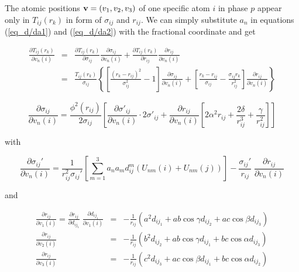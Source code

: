 The atomic positions ${\bf v} = (v_{1},v_{2},v_{3})$ of one specific
atom $i$ in phase $p$ appear only in $T_{ij}(r_{k})$ in form of
$\sigma_{ij}$ and $r_{ij}$. We can simply substitute $a_{n}$ in equations
(\ref{eq_d/da1}) and (\ref{eq_d/da2}) with the fractional coordinate and get

\begin{eqnarray}
  \frac{\partial T_{ij}(r_{k})}{\partial v_{n}(i)} & = &
     \frac{\partial T_{ij}(r_{k})}{\partial \sigma_{ij}}
     \frac{\partial \sigma_{ij}} {\partial v_{n}(i)} +
     \frac{\partial T_{ij}(r_{k})}{\partial r_{ij}}
     \frac{\partial r_{ij}}      {\partial v_{n}(i)} \nonumber \\
  & = & \frac{T_{ij}(r_{k})}{\sigma_{ij}} \left \{ \left [
     \frac{(r_{k} - r_{ij})^{2}}{\sigma_{ij}^{2}} - 1 \right ]
     \frac{\partial \sigma_{ij}} {\partial v_{n}(i)} +
     \left [ \frac{r_{k} - r_{ij}}{\sigma_{ij}}
           - \frac{\sigma_{ij} r_{k}}{r^{2}_{ij}} \right ]
     \frac{\partial r_{ij}}{\partial v_{n}(i)} \right \}
  \label{eq_d/df1}
\end{eqnarray}

\begin{equation}
    \frac{\partial \sigma_{ij}}{\partial v_{n}(i)} =
    \frac{\phi^{2}(r_{ij})}{2 \sigma_{ij}} \left [
    \frac{\partial \sigma'_{ij}}{\partial v_{n}(i)} \cdot 2
    \sigma'_{ij} +
    \frac{\partial r_{ij}}{\partial v_{n}(i)} \left [
    2 \alpha^{2} r_{ij} + \frac{2 \delta}{r^{3}_{ij}} +
    \frac{\gamma}{r^{2}_{ij}} \right ] \right ]
  \label{eq_d/df2}
\end{equation}

\noindent
with

\begin{equation}
  \frac{\partial \sigma_{ij}'} {\partial v_{n}(i)} =
    \frac{1}{r_{ij}^{2}\sigma_{ij}'} \left [ \sum_{m=1}^{3}
    a_{n}a_{m}d_{ij}^{m} ( U_{nm}(i) + U_{nm}(j)) \right ] -
    \frac{\sigma_{ij}'}{r_{ij}} \;
    \frac{\partial r_{ij}} {\partial v_{n}(i)}
  \label{eq_d/df3}
\end{equation}

\noindent
and

\begin{eqnarray}
  \frac{\partial r_{ij}} {\partial v_{1}(i)} =
  \frac{\partial r_{ij}}     {\partial d_{ij_{1}}} \;
  \frac{\partial d_{ij_{1}}} {\partial v_{1}(i)} & = &
   -\frac{1}{r_{ij}}(a^{2}d_{ij_{1}}+ab\cos\gamma d_{ij_{2}}+
                                     ac\cos\beta  d_{ij_{3}})\\
  \frac{\partial r_{ij}} {\partial v_{2}(i)} & = &
   -\frac{1}{r_{ij}}(b^{2}d_{ij_{2}}+ab\cos\gamma d_{ij_{1}}+
                                     bc\cos\alpha d_{ij_{3}})\\
  \frac{\partial r_{ij}} {\partial v_{3}(i)} & = &
   -\frac{1}{r_{ij}}(c^{2}d_{ij_{3}}+ac\cos\beta  d_{ij_{1}}+
                                     bc\cos\alpha d_{ij_{2}})
  \label{eq_d/df4}
\end{eqnarray}

